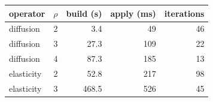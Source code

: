 {\small
\begin{tabular}{lrrrr}
\toprule
operator & $\rho$ & build (s) & apply (ms) & iterations \\
\midrule
diffusion & 2 & 3.4 & 49 & 46 \\
diffusion & 3 & 27.3 & 109 & 22 \\
diffusion & 4 & 87.3 & 185 & 13 \\
elasticity & 2 & 52.8 & 217 & 98 \\
elasticity & 3 & 468.5 & 526 & 45 \\
\bottomrule
\end{tabular}
}
